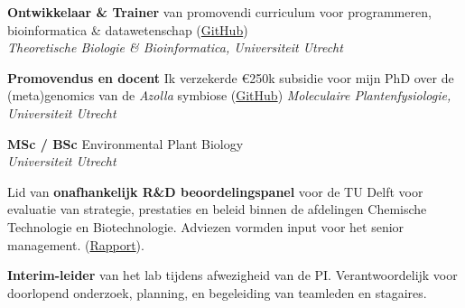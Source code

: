 \documentclass[a4paper,10pt]{article}
\begin{document}
{\begin{adjustbox}{valign=t}
\begin{minipage}[t]{0.6\textwidth}
\begin{description}
\raggedright
  \item[\normalfont \textcolor{ForestGreen}{\textbf{2022 -- heden.}}] \textbf{Ontwikkelaar \& Trainer} 
    van promovendi curriculum voor programmeren, bioinformatica \& datawetenschap 
    (\href{https://github.com/lauralwd/professional_education}{GitHub})\\
    \textit{Theoretische Biologie \& Bioinformatica, Universiteit Utrecht}
  \item[\normalfont \textcolor{ForestGreen}{\textbf{2017 -- 2022.}}] \textbf{Promovendus en docent} 
    Ik verzekerde €250k subsidie voor mijn PhD over de (meta)genomics van de \textit{Azolla} symbiose
    (\href{https://github.com/lauralwd/azolla_phd_thesis}{GitHub}) 
    \textit{Moleculaire Plantenfysiologie, Universiteit Utrecht}
  \item[\normalfont \textcolor{ForestGreen}{\textbf{2010 -- 2017.}}] \textbf{MSc / BSc} Environmental Plant Biology \\
    \textit{Universiteit Utrecht}
\end{description}


\begin{description}
\raggedright
  \item[\normalfont \textcolor{ForestGreen}{\textbf{2021 -- 2022.}}] 
    Lid van \textbf{onafhankelijk R\&D beoordelingspanel} voor de TU Delft voor evaluatie van strategie, prestaties en beleid 
    binnen de afdelingen Chemische Technologie en Biotechnologie. 
    Adviezen vormden input voor het senior management. 
    (\href{https://filelist.tudelft.nl/TUDelft/Onderzoek/Kwaliteitsborging/Final report SEP Chemistry TU Delft 20220204.pdf}{Rapport}).
  
  \item[\normalfont \textcolor{ForestGreen}{\textbf{2019.}}] \textbf{Interim-leider} 
    van het lab tijdens afwezigheid van de PI.
    Verantwoordelijk voor doorlopend onderzoek, planning, en begeleiding van teamleden en stagaires.
 

\end{description}
\end{minipage}
\end{adjustbox}}
\end{document}

